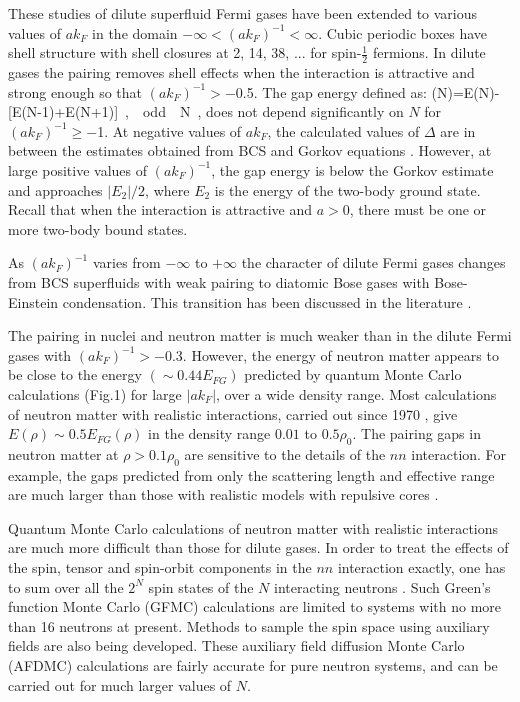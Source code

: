 These studies of dilute superfluid Fermi gases have been extended to various 
values of $ak_F$ in the domain $- \infty < (ak_F)^{-1} < \infty$.  Cubic periodic 
boxes have shell structure with shell closures at 2, 14, 38, ... for
spin-$\frac{1}{2}$ fermions.  In dilute gases the pairing removes shell 
effects when the interaction is attractive and strong enough so that 
$(ak_F)^{-1} > -$0.5.  The gap energy 
defined as:
\beq
\Delta(N)=E(N)-[E(N-1)+E(N+1)]~,~~odd~~N~,
\eeq
does not depend significantly on $N$ for $(ak_F)^{-1} \geq -$1.  At negative values 
of $ak_F$, the calculated values of $\Delta$ are in between the estimates 
obtained from BCS and Gorkov equations \cite{sfgprl}.  
However, at large positive values of 
$(ak_F)^{-1}$, the gap energy is below the Gorkov estimate and approaches 
$|E_2|/2$, where $E_2$ is the energy of the two-body ground state.  Recall that when 
the interaction is attractive and $a > 0$, there must be one or more two-body 
bound states. 

As $(ak_F)^{-1}$ varies from $-\infty$ to $+\infty$ the character of dilute Fermi 
gases changes from BCS superfluids with weak pairing to diatomic Bose gases with 
Bose-Einstein condensation.  This transition has been discussed in the literature 
\cite{Leggett,Randeria}. 

The pairing in nuclei and neutron matter is much weaker than in the dilute 
Fermi gases with $(ak_F)^{-1} > -$0.3.  However, the energy of neutron matter 
appears to be close to the energy $(\sim 0.44 E_{FG})$ predicted by quantum 
Monte Carlo calculations (Fig.1) for large $|ak_F|$,  
over a wide density range. 
Most calculations of neutron matter with realistic interactions, carried out since 
1970 \cite{anr1}, give $E(\rho) \sim 0.5 E_{FG}(\rho)$ in the density range 
$0.01$ to $0.5 \rho_0$.  The pairing gaps in neutron matter at $\rho > 0.1 \rho_0$ 
are sensitive to the details of the $nn$ interaction.  For example, the gaps 
predicted from only the scattering length and effective range are much larger 
than those with realistic models with repulsive cores \cite{rmp1}. 

Quantum Monte Carlo calculations of neutron matter with realistic interactions 
are much more difficult than those for dilute gases.  In order to treat the effects of 
the spin, tensor and spin-orbit components in the $nn$ interaction 
exactly, one has to sum over all the $2^N$ spin states of the $N$ interacting 
neutrons \cite{nmgfmc}.  Such Green's function Monte Carlo (GFMC) calculations 
are limited to systems with no more than 16 neutrons at present.  Methods
to sample the spin space using auxiliary fields are also being developed. 
These auxiliary field diffusion Monte Carlo (AFDMC) calculations \cite{afdmc} 
are fairly accurate for pure neutron systems, and can be carried out for much larger values of $N$. 

